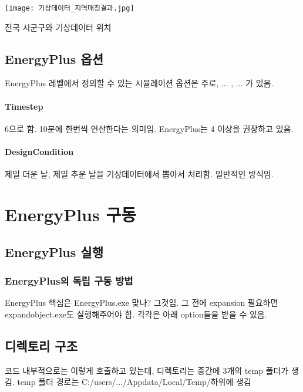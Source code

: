 \begin{defaultfigure}
  \texttt{[image: 기상데이터\_지역매칭결과.jpg]}
  \caption{전국 시군구와 기상데이터 위치}
  \label{fig:addr2weather_mapping}
\end{defaultfigure}


\subsection{EnergyPlus 옵션}
EnergyPlus 레벨에서 정의할 수 있는 시뮬레이션 옵션은 주로, ... , ... 가 있음.
\paragraph{Timestep} 6으로 함. 10분에 한번씩 연산한다는 의미임. EnergyPlus는 4 이상을 권장하고 있음.
\paragraph{DesignCondition} 제일 더운 날, 제일 추운 날을 기상데이터에서 뽑아서 처리함. 일반적인 방식임.


\section{EnergyPlus 구동}
\subsection{EnergyPlus 실행}
\subsubsection{EnergyPlus의 독립 구동 방법}
EnergyPlus 핵심은 EnergyPlus.exe 맞나? 그것임.
그 전에 expansion 필요하면 expandobject.exe도 실행해주어야 함.
각각은 아래 option들을 받을 수 있음.

\subsection{디렉토리 구조}
코드 내부적으로는 이렇게 호출하고 있는데,
디렉토리는 중간에 3개의 temp 폴더가 생김.
temp 폴더 경로는 C:/users/.../Appdata/Local/Temp/하위에 생김


